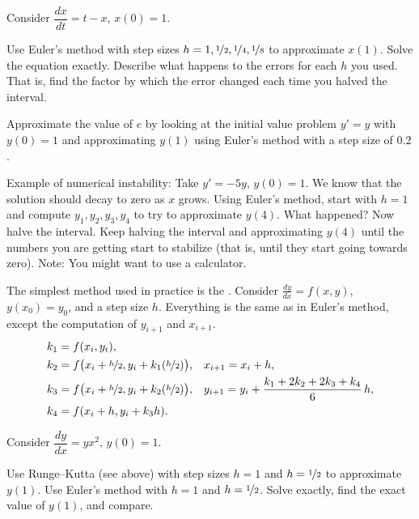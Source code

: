 \begin{samepage}
\begin{exercise}
Consider $\dfrac{dx}{dt} = t-x$, $x(0)=1$.
\begin{tasks}
\task Use Euler's method
with step sizes $h = 1, \nicefrac{1}{2}, \nicefrac{1}{4}, \nicefrac{1}{8}$ to
approximate
$x(1)$. 
\task Solve the equation exactly.
\task Describe what happens to the
errors for each $h$ you used.  That is, find the factor by which the error
changed each time you halved the interval.
\end{tasks}
\end{exercise}
\end{samepage}

\begin{exercise}
Approximate the value of $e$ by looking at the initial value problem
$y'=y$ with $y(0)=1$ and approximating $y(1)$ using Euler's method with
a step size of $0.2$.
\end{exercise}

\begin{exercise}
Example of numerical instability:
Take $y' = -5y$, $y(0) = 1$.  We know that the
solution should decay to zero as $x$ grows.
Using Euler's method, start with $h=1$ and compute
$y_1, y_2, y_3, y_4$ to try to approximate $y(4)$.  What happened?
Now halve the interval.  Keep halving the interval and approximating $y(4)$
until the numbers you are getting
start to stabilize (that is, until they start going towards zero).
Note: You might want to use a calculator.
\end{exercise}

The simplest method used in practice is the
\emph{}.
Consider $\frac{dy}{dx}=f(x,y)$, $y(x_0) = y_0$,
and a step size $h$.  Everything is the same as in Euler's method, except
the computation of $y_{i+1}$ and $x_{i+1}$.
\begin{align*}
& k_1 = f(x_i,y_i) , & & \\
& k_2 = f\bigl(x_i + \nicefrac{h}{2},y_i + k_1 (\nicefrac{h}{2})\bigr) ,
& & 
x_{i+1} = x_i + h , \\
& k_3 = f\bigl(x_i + \nicefrac{h}{2},y_i + k_2 (\nicefrac{h}{2})\bigr) ,
& &
y_{i+1} = y_i + \frac{k_1 + 2k_2 + 2k_3 + k_4}{6}\,h ,  \\
& k_4 = f(x_i + h,y_i + k_3 h) .
\end{align*}


\begin{exercise}
\pagebreak[2]
Consider $\dfrac{dy}{dx} = yx^2$, $y(0)=1$.
\begin{tasks}
\task Use Runge--Kutta (see above) with step sizes $h=1$ and $h=\nicefrac{1}{2}$
to approximate $y(1)$.
\task Use Euler's method with $h=1$ and
$h=\nicefrac{1}{2}$.
\task Solve exactly, find the exact value of
$y(1)$, and compare.
\end{tasks}
\end{exercise}

